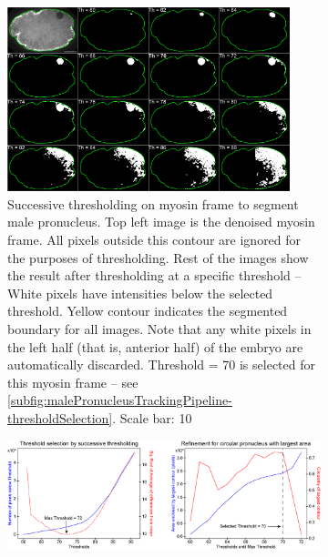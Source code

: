 \begin{figure}[h]
\centering
\begin{subfigure}{\textwidth}
    \centering
    \includegraphics[width=0.9\textwidth]{ExpMethods/FigTrackingPipeline/successiveThreshold.png}
    \caption{Successive thresholding on myosin frame to segment male pronucleus. Top left image is the denoised myosin frame. All pixels outside this contour are ignored for the purposes of thresholding. Rest of the images show the result after thresholding at a specific threshold -- White pixels have intensities below the selected threshold. Yellow contour indicates the segmented boundary for all images. Note that any white pixels in the left half (that is, anterior half) of the embryo are automatically discarded. Threshold = \num{70} is selected for this myosin frame -- see \autoref{subfig:malePronucleusTrackingPipeline-thresholdSelection}. Scale bar: \SI{10}{\unitLength}} 
    \label{subfig:malePronucleusTrackingPipeline-successiveThreshold}
\end{subfigure}
\hfill
\vspace{1mm}
\begin{subfigure}{\textwidth}
    \centering
    \includegraphics[width=\textwidth]{ExpMethods/FigTrackingPipeline/thresholdSelection.png}

\end{subfigure}
\end{figure}
